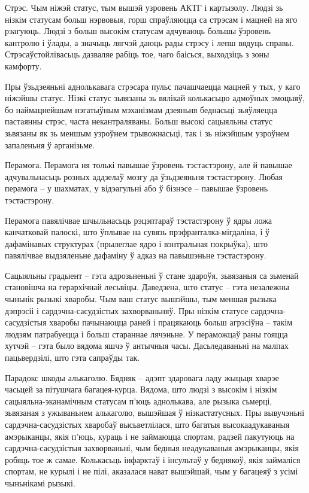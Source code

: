 Стрэс. Чым ніжэй статус, тым вышэй узровень АКТГ і картызолу. Людзі зь нізкім статусам больш нэрвовыя, горш спраўляюцца са стрэсам і мацней на яго рэагуюць. Людзі з больш высокім статусам адчуваюць большы ўзровень кантролю і ўлады, а значыць лягчэй даюць рады стрэсу і лепш вядуць справы. Стрэсаўстойлівасьць дазваляе рабіць тое, чаго баісься, выходзіць з зоны камфорту.

Пры ўзьдзеяньні аднолькавага стрэсара пульс пачашчаецца мацней у тых, у каго ніжэйшы статус. Нізкі статус зьвязаны зь вялікай колькасьцю адмоўных эмоцыяў, бо наймацнейшым нэгатыўным мэханізмам дзеяньня беднасьці зьяўляецца пастаянны стрэс, часта некантраляваны. Больш высокі сацыяльны статус зьвязаны як зь меншым узроўнем трывожнасьці, так і зь ніжэйшым узроўнем запаленьня ў арганізьме.

Перамога. Перамога ня толькі павышае ўзровень тэстастэрону, але й павышае адчувальнасьць розных аддзелаў мозгу да ўзьдзеяньня тэстастэрону. Любая перамога – у шахматах, у відэагульні або ў бізнэсе – павышае ўзровень тэстастэрону. 

Перамога павялічвае шчыльнасьць рэцэптараў тэстастэрону ў ядры ложа канчатковай палоскі, што ўплывае на сувязь прэфранталка-мігдаліна, і ў дафамінавых структурах (прылеглае ядро і вэнтральная покрыўка), што павялічвае выдзяленьне дафаміну ў адказ на павышэньне тэстастэрону.

Сацыяльны градыент – гэта адрозьненьні ў стане здароўя, зьвязаныя са зьменай становішча на герархічнай лесьвіцы. Даведзена, што статус – гэта незалежны чыньнік рызыкі хваробы. Чым ваш статус вышэйшы, тым меншая рызыка дэпрэсіі і сардэчна-сасудзістых захворваньняў. Пры нізкім статусе сардэчна-сасудзістыя хваробы пачынаюцца раней і працякаюць больш агрэсіўна – такім людзям патрабуецца і больш стараннае лячэньне. У пераможцаў раны гояцца хутчэй – гэта было вядома яшчэ ў антычныя часы. Дасьледаваньні на малпах пацьвердзілі, што гэта сапраўды так.

Парадокс шкоды алькаголю. Бядняк – адэпт здаровага ладу жыцьця хварэе часьцей за пітушчага багацея-курца. Вядома, што людзі з высокім і нізкім сацыяльна-эканамічным статусам п'юць аднолькава, але рызыка сьмерці, зьвязаная з ужываньнем алькаголю, вышэйшая ў нізкастатусных. Пры вывучэньні сардэчна-сасудзістых хваробаў высьветлілася, што багатыя высокаадукаваныя амэрыканцы, якія п'юць, кураць і не займаюцца спортам, радзей пакутуюць на сардэчна-сасудзістыя захворваньні, чым бедныя неадукаваныя амэрыканцы, якія робяць тое ж самае. Колькасьць інфарктаў і інсультаў у беднякоў, якія займаліся спортам, не курылі і не пілі, аказалася нават вышэйшай, чым у багацеяў з усімі чыньнікамі рызыкі.

